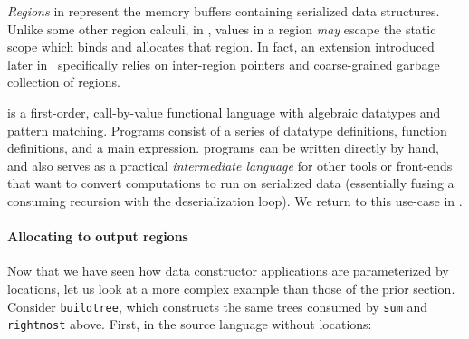 \documentclass[showabstract,showacknowledgments,showpreface,showdedication]{iuphd}
\begin{document}
{\emph{Regions} in \ourcalc{} represent the memory buffers containing serialized data
  structures.  Unlike some other region calculi, in \ourcalc{}, values in a
  region \emph{may} escape the static scope which binds and allocates that region. In
  fact, an extension introduced later in~
  specifically relies on inter-region pointers and coarse-grained garbage
  collection of regions.}


\ourcalc{} is a first-order,
call-by-value functional language with algebraic datatypes and pattern
matching. Programs consist of a series of datatype definitions, function
definitions, and a main expression.
%
%
\ourcalc{} programs can be written directly by hand, and \ourcalc{} also serves
as a practical {\em intermediate language} for other tools or front-ends that
want to convert computations to run on serialized data (essentially fusing a
consuming recursion with the deserialization loop).
%
We return to this use-case in .

\paragraph{Allocating to output regions}
%
Now that we have seen how data constructor applications are parameterized by
locations, let us look at a more complex example than those of the prior section.
Consider \lstinline[mathescape]{buildtree}, which constructs the same trees consumed by \lstinline[mathescape]{sum}
and \lstinline[mathescape]{rightmost} above.  First, in the source language without locations:
\end{document}
